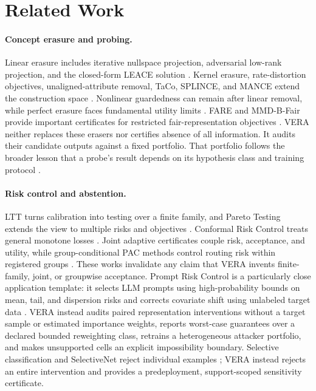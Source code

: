 \section{Related Work}

\paragraph{Concept erasure and probing.}
Linear erasure includes iterative nullspace projection, adversarial
low-rank projection, and the closed-form LEACE solution
\cite{ravfogel2020null,ravfogel2022linear,belrose2023leace}. Kernel erasure,
rate-distortion objectives, unaligned-attribute removal, TaCo, SPLINCE, and
MANCE extend the construction space
\cite{ravfogel2022kernel,chowdhury2023kram,shao2023unaligned,jourdan2023taco,holstege2025splince,avitan2026mance}.
Nonlinear guardedness can remain after linear removal, while perfect erasure
faces fundamental utility limits
\cite{akbari2025obliviator,chowdhury2025limits}. FARE and MMD-B-Fair provide
important certificates for restricted fair-representation objectives
\cite{jovanovic2023fare,deka2023mmdbfair}. VERA neither replaces these erasers
nor certifies absence of all information. It audits their candidate outputs
against a fixed portfolio. That portfolio follows the broader lesson that a
probe's result depends on its hypothesis class and training protocol
\cite{hewitt2019control,pimentel2020probing,voita2020mdl,elazar2021amnesic}.

\paragraph{Risk control and abstention.}
LTT turns calibration into testing over a finite family, and Pareto Testing
extends the view to multiple risks and objectives
\cite{angelopoulos2025ltt,laufer2023pareto}. Conformal Risk Control treats
general monotone losses \cite{angelopoulos2024crc}. Joint adaptive certificates
couple risk, acceptance, and utility, while group-conditional PAC methods
control routing risk within registered groups
\cite{yu2026joint,huang2026conditional}. These works invalidate any claim that
VERA invents finite-family, joint, or groupwise acceptance. Prompt Risk Control
is a particularly close application template: it selects LLM prompts using
high-probability bounds on mean, tail, and dispersion risks and corrects
covariate shift using unlabeled target data \cite{zollo2024prompt}. VERA instead
audits paired representation interventions without a target sample or estimated
importance weights, reports worst-case guarantees over a declared bounded
reweighting class, retrains a heterogeneous attacker portfolio, and makes
unsupported cells an explicit impossibility boundary. Selective
classification and SelectiveNet reject individual examples
\cite{elyaniv2010foundations,geifman2017selective,geifman2019selectivenet}; VERA
instead rejects an entire intervention and provides a predeployment,
support-scoped sensitivity certificate.

